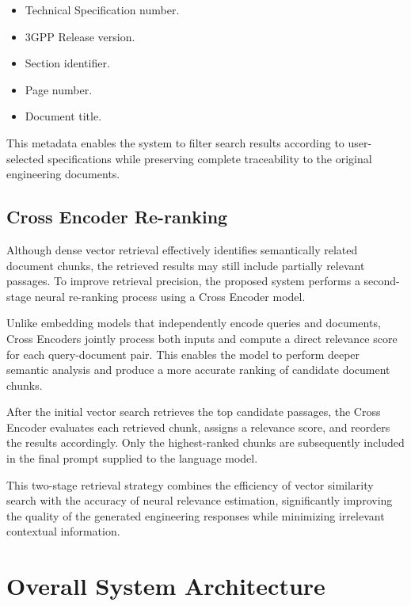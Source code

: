 \begin{itemize}
    \item Technical Specification number.
    \item 3GPP Release version.
    \item Section identifier.
    \item Page number.
    \item Document title.
\end{itemize}

This metadata enables the system to filter search results according to user-selected specifications while preserving complete traceability to the original engineering documents.

\subsection{Cross Encoder Re-ranking}

Although dense vector retrieval effectively identifies semantically related document chunks, the retrieved results may still include partially relevant passages. To improve retrieval precision, the proposed system performs a second-stage neural re-ranking process using a Cross Encoder model.

Unlike embedding models that independently encode queries and documents, Cross Encoders jointly process both inputs and compute a direct relevance score for each query-document pair. This enables the model to perform deeper semantic analysis and produce a more accurate ranking of candidate document chunks.

After the initial vector search retrieves the top candidate passages, the Cross Encoder evaluates each retrieved chunk, assigns a relevance score, and reorders the results accordingly. Only the highest-ranked chunks are subsequently included in the final prompt supplied to the language model.

This two-stage retrieval strategy combines the efficiency of vector similarity search with the accuracy of neural relevance estimation, significantly improving the quality of the generated engineering responses while minimizing irrelevant contextual information.
\section{Overall System Architecture}

